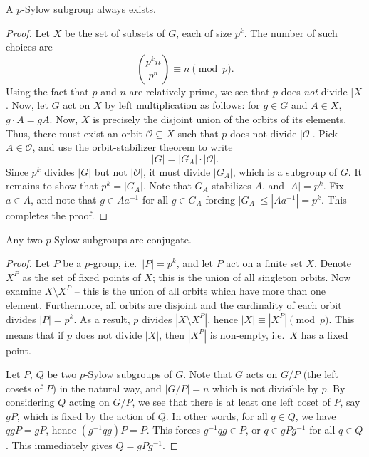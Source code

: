 \documentclass[11pt]{article}
\theoremstyle{definition}
\theoremstyle{remark}
\numberwithin{equation}{section}
\begin{document}
    \begin{theorem}
        A $p$-Sylow subgroup always exists.
    \end{theorem}
    \begin{proof}
        Let $X$ be the set of subsets of $G$, each of size $p^k$. The number of such
        choices are \[
            \binom{p^k n}{p^n} \equiv n \pmod{p}.
        \] Using the fact that $p$ and $n$ are relatively prime, we see that $p$ does
        \emph{not} divide $|X|$. Now, let $G$ act on $X$ by left multiplication as
        follows: for $g \in G$ and $A \in X$, $g\cdot A = gA$. Now, $X$ is precisely
        the disjoint union of the orbits of its elements. Thus, there must exist an
        orbit $\mathscr{O} \subseteq X$ such that $p$ does not divide
        $|\mathscr{O}|$. Pick $A \in \mathscr{O}$, and use the orbit-stabilizer
        theorem to write \[
            |G| = |G_A|\cdot |\mathscr{O}|.
        \] Since $p^k$ divides $|G|$ but not $|\mathscr{O}|$, it must divide $|G_A|$,
        which is a subgroup of $G$. It remains to show that $p^k = |G_A|$.  Note that
        $G_A$ stabilizes $A$, and $|A| = p^k$. Fix $a \in A$, and note that $g \in
        Aa^{-1}$ for all $g \in G_A$ forcing $|G_A| \leq |Aa^{-1}| = p^k$. This
        completes the proof.
    \end{proof}

    \begin{theorem}
        Any two $p$-Sylow subgroups are conjugate.
    \end{theorem}
    \begin{proof}
        Let $P$ be a $p$-group, i.e.\ $|P| = p^k$, and let $P$ act on a finite set
        $X$. Denote $X^P$ as the set of fixed points of $X$; this is the union of all
        singleton orbits. Now examine $X\setminus X^P$ -- this is the union of all
        orbits which have more than one element. Furthermore, all orbits are disjoint
        and the cardinality of each orbit divides $|P| = p^k$. As a result, $p$
        divides $|X\setminus X^P|$, hence $|X| \equiv |X^P| \pmod{p}$.
        This means that if $p$ does not divide $|X|$, then $|X^P|$ is non-empty,
        i.e.\ $X$ has a fixed point.

        Let $P$, $Q$ be two $p$-Sylow subgroups of $G$. Note that $G$ acts on $G/P$
        (the left cosets of $P$) in the natural way, and $|G / P| = n$ which is not
        divisible by $p$. By considering $Q$ acting on $G / P$, we see that there is
        at least one left coset of $P$, say $gP$, which is fixed by the action of
        $Q$. In other words, for all $q \in Q$, we have $qgP = gP$, hence
        $(g^{-1}qg)P = P$. This forces $g^{-1}qg \in P$, or $q \in gPg^{-1}$ for all
        $q \in Q$. This immediately gives $Q = gPg^{-1}$.
    \end{proof}
\end{document}
